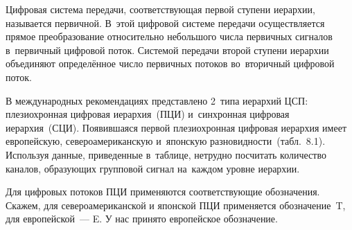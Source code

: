 \documentclass[
	a4paper,
	oneside,
	BCOR = 10mm,
	DIV = 12,
	12pt,
	headings = normal,
]{scrartcl}
\begin{document}
					Цифровая система передачи, соответствующая первой ступени иерархии, называется первичной. В~этой цифровой системе передачи осуществляется прямое преобразование относительно небольшого числа первичных сигналов в~первичный цифровой поток. Системой передачи второй ступени иерархии объединяют определённое число первичных потоков во~вторичный цифровой поток.

					В международных рекомендациях представлено 2~типа иерархий ЦСП: плезиохронная цифровая иерархия~(ПЦИ) и~синхронная цифровая иерархия~(СЦИ). Появившаяся первой плезиохронная цифровая иерархия имеет европейскую, североамериканскую и~японскую разновидности~(табл.~8.1). Используя данные, приведенные в~таблице, нетрудно посчитать количество каналов, образующих групповой сигнал на~каждом уровне иерархии.

					Для цифровых потоков ПЦИ применяются соответствующие обозначения. Скажем, для североамериканской и японской ПЦИ применяется обозначение~T, для европейской~— E. У нас принято европейское обозначение.
\end{document}
